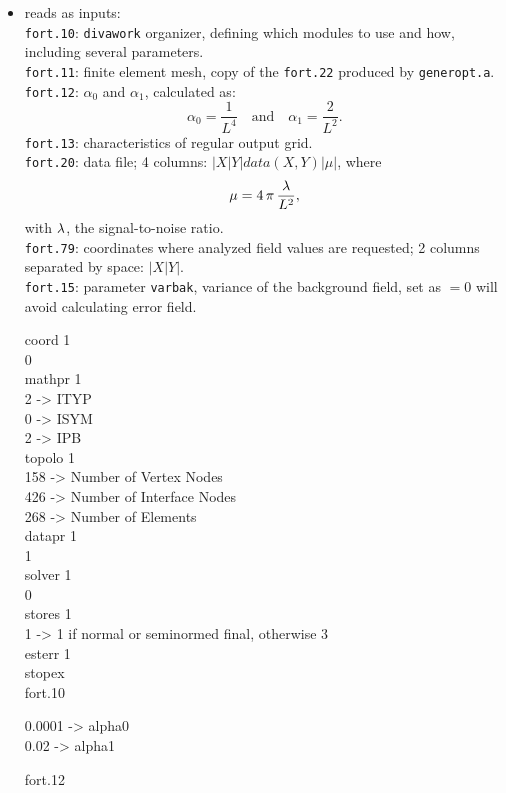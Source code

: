 \begin{itemize}	
    \item reads as inputs: \\								
	 	\texttt{fort.10}:			\texttt{divawork} organizer, defining which modules to use and how, including several parameters.\\					
		\texttt{fort.11}:			finite element mesh, copy of the \texttt{fort.22} produced by \texttt{generopt.a}.\\					
	 	\texttt{fort.12}:			$\alpha_0$ and $\alpha_1$, calculated as: 
	 	\[\alpha_0=\frac{1}{L^{4}}\quad \textrm{and}  \quad  \alpha_1 =\frac{2}{L^{2}}.	\]				
	 	\texttt{fort.13}:			characteristics of regular output grid.\\					
		\texttt{fort.20}:			data file; 4 columns: $|X|Y|data(X,Y)|\mu|$, where  
		\[ \mu = 4\,\pi\,\frac{\lambda}{L^{2}},\]
	  with $\lambda$, the signal-to-noise ratio.	\\				
		\texttt{fort.79}:			coordinates where analyzed field values are requested; 2 columns separated by space: $|X|Y|$. \\					
	 	\texttt{fort.15}:			parameter \texttt{varbak}, variance of the background field, set as $=0$ will avoid calculating error field.				

\begin{exfile}[H]
coord 1\\
0\\
mathpr 1\\
2  -> ITYP\\
0  -> ISYM\\
2  -> IPB\\
topolo 1\\
 158 -> Number of Vertex Nodes\\
 426 -> Number of Interface Nodes\\
 268 -> Number of Elements\\
datapr 1\\
1\\
solver 1\\
0\\
stores 1\\
1  -> 1 if normal or seminormed final, otherwise 3\\
esterr 1\\
stopex\\
\caption{fort.10}
\end{exfile}
	  
	  
\begin{exfile}[H]
0.0001  -> alpha0\\
0.02  -> alpha1
\caption{fort.12}
\end{exfile}


\end{itemize}
